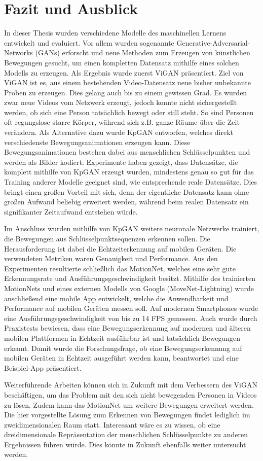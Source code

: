 \chapter{Fazit und Ausblick}
In dieser Thesis wurden verschiedene Modelle des maschinellen Lernens entwickelt
und evaluiert. Vor allem wurden sogenannte Generative-Adversarial-Networks
(GANs) erforscht und neue Methoden zum Erzeugen von künstlichen Bewegungen
gesucht, um einen kompletten Datensatz mithilfe eines solchen Modells zu
erzeugen. Als Ergebnis wurde zuerst ViGAN präsentiert. Ziel von ViGAN ist es,
aus einem bestehenden Video-Datensatz neue bisher unbekannte Proben zu erzeugen.
Dies gelang auch bis zu einem gewissen Grad. Es wurden zwar neue Videos vom
Netzwerk erzeugt, jedoch konnte nicht sichergestellt werden, ob sich eine Person
tatsächlich bewegt oder still steht.  So sind Personen oft regungslose starre
Körper, während sich z.B. ganze Räume über die Zeit verändern. Als Alternative
dazu wurde KpGAN entworfen, welches direkt verschiedenste Bewegungsanimationen
erzeugen kann. Diese Bewegungsanimationen bestehen dabei aus menschlichen
Schlüsselpunkten und werden als Bilder kodiert.  Experimente haben gezeigt, dass
Datensätze, die komplett mithilfe von KpGAN erzeugt wurden, mindestens genau so
gut für das Training anderer Modelle geeignet sind, wie entsprechende reale
Datensätze.  Dies bringt einen großen Vorteil mit sich, denn der eigentliche
Datensatz kann ohne großen Aufwand beliebig erweitert werden, während beim
realen Datensatz ein signifikanter Zeitaufwand entstehen würde.

Im Anschluss wurden mithilfe von KpGAN weitere neuronale Netzwerke trainiert,
die Bewegungen aus Schlüsselpunktsequenzen erkennen sollen.  Die Herausforderung
ist dabei die Echtzeiterkennung auf mobilen Geräten. Die verwendeten Metriken
waren Genauigkeit und Performance. Aus den Experimenten resultierte schließlich
das MotionNet, welches eine sehr gute Erkennungsrate und Ausführungsgeschwindigkeit
besitzt.  Mithilfe des trainierten MotionNets und eines externen Modells von
Google (MoveNet-Lightning) wurde anschließend eine mobile App entwickelt, welche
die Anwendbarkeit und Performance auf mobilen Geräten messen soll. Auf modernen
Smartphones wurde eine Aus\-führ\-ungs\-ge\-schwindig\-keit von bis zu 14 FPS
gemessen. Auch wurde durch Praxistests bewiesen, dass eine Bewegungserkennung
auf modernen und älteren mobilen Plattformen in Echtzeit ausführbar ist und
tatsächlich Bewegungen erkennt. Damit wurde die Forschungsfrage, ob eine
Bewegungserkennung auf mobilen Geräten in Echtzeit ausgeführt werden kann,
beantwortet und eine Beispiel-App präsentiert.

Weiterführende Arbeiten können sich in Zukunft mit dem Verbessern des ViGAN
be\-schäf\-tigen, um das Problem mit den sich nicht bewegenden Personen in
Videos zu lösen. Zudem kann das MotionNet um weitere Bewegungen erweitert
werden. Die hier vorgestellte Lösung zum Erkennen von Bewegungen findet
lediglich im zweidimensionalen Raum statt. Interessant wäre es zu wissen, ob
eine dreidimensionale Repräsentation der menschlichen Schlüsselpunkte zu anderen
Ergebnissen führen würde. Dies könnte in Zukunft ebenfalls weiter
untersucht werden.
